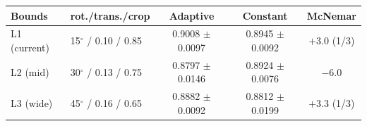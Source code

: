 \begin{tabular}{@{}llccc@{}}
\toprule
Bounds & rot./trans./crop & Adaptive & Constant & McNemar \\
\midrule
L1 (current) & 15$^{\circ}$ / 0.10 / 0.85 & 0.9008 $\pm$ 0.0097 & 0.8945 $\pm$ 0.0092 & $+3.0$ (1/3) \\
L2 (mid) & 30$^{\circ}$ / 0.13 / 0.75 & 0.8797 $\pm$ 0.0146 & 0.8924 $\pm$ 0.0076 & $-6.0$ \\
L3 (wide) & 45$^{\circ}$ / 0.16 / 0.65 & 0.8882 $\pm$ 0.0092 & 0.8812 $\pm$ 0.0199 & $+3.3$ (1/3) \\
\bottomrule
\end{tabular}
